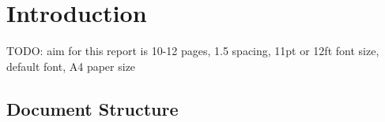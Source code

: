 \chapter{Introduction}\label{ch:introduction}

TODO: aim for this report is 10-12 pages, 1.5 spacing, 11pt or 12ft font size, default font, A4 paper size

\section{Document Structure}\label{sec:document_structure}
